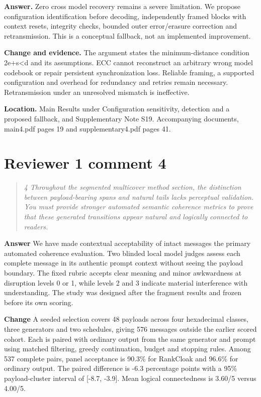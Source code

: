 \documentclass[11pt]{article}
\newenvironment{reviewcomment}{\begin{quote}\color{commentgray}\itshape}{\end{quote}}
\begin{document}
\textbf{Answer.} Zero cross model recovery remains a severe limitation. We propose configuration identification before decoding, independently framed blocks with context resets, integrity checks, bounded outer error/erasure correction and retransmission. This is a conceptual fallback, not an implemented improvement.

\textbf{Change and evidence.} The argument states the minimum-distance condition 2e+s<d and its assumptions. ECC cannot reconstruct an arbitrary wrong model codebook or repair persistent synchronization loss. Reliable framing, a supported configuration and overhead for redundancy and retries remain necessary. Retransmission under an unresolved mismatch is ineffective.

\textbf{Location.} Main Results under Configuration sensitivity, detection and a proposed fallback, and Supplementary Note S19. Accompanying documents, main4.pdf pages 19 and supplementary4.pdf pages 41.


\section*{Reviewer 1 comment 4}\label{resp:R1-4}
\begin{reviewcomment}
4 Throughout the segmented multicover method section, the distinction between payload-bearing spans and natural tails lacks perceptual validation. You must provide stronger automated semantic coherence metrics to prove that these generated transitions appear natural and logically connected to readers.
\end{reviewcomment}

\textbf{Answer} We have made contextual acceptability of intact messages the primary automated coherence evaluation. Two blinded local model judges assess each complete message in its authentic prompt context without seeing the payload boundary. The fixed rubric accepts clear meaning and minor awkwardness at disruption levels 0 or 1, while levels 2 and 3 indicate material interference with understanding. The study was designed after the fragment results and frozen before its own scoring.

\textbf{Change} A seeded selection covers 48 payloads across four hexadecimal classes, three generators and two schedules, giving 576 messages outside the earlier scored cohort. Each is paired with ordinary output from the same generator and prompt using matched filtering, greedy continuation, budget and stopping rules. Among 537 complete pairs, panel acceptance is 90.3\% for RankCloak and 96.6\% for ordinary output. The paired difference is -6.3 percentage points with a 95\% payload-cluster interval of [-8.7, -3.9]. Mean logical connectedness is 3.60/5 versus 4.00/5.
\end{document}
